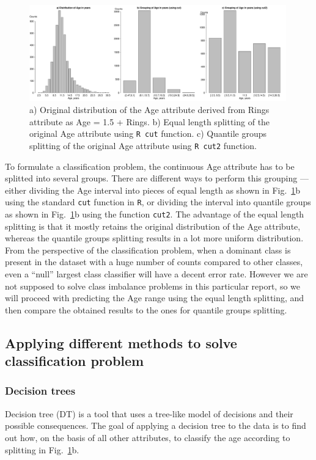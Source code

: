 \documentclass[10pt, paper=a4]{article}
\begin{document}
\begin{figure}[htbp]
  \centering \includegraphics[width =
    0.99\textwidth]{age_grouping.pdf} \cprotect\caption{a) Original
    distribution of the Age attribute derived from Rings attribute as
    Age = 1.5 + Rings.  b) Equal length splitting of the original Age
    attribute using \verb|R cut| function.  c) Quantile groups
    splitting of the original Age attribute using \verb|R cut2|
    function.}
  \label{fig:age_grouping}
\end{figure}

To formulate a classification problem, the continuous Age attribute
has to be splitted into several groups.  There are different ways to
perform this grouping --- either dividing the Age interval into pieces
of equal length as shown in Fig.~\ref{fig:age_grouping}b using the
standard \verb|cut| function in \verb|R|, or dividing the interval
into quantile groups as shown in Fig.~\ref{fig:age_grouping}b using
the function \verb|cut2|.  The advantage of the equal length splitting
is that it mostly retains the original distribution of the Age
attribute, whereas the quantile groups splitting results in a lot more
uniform distribution.  From the perspective of the classification
problem, when a dominant class is present in the dataset with a huge
number of counts compared to other classes, even a ``null'' largest
class classifier will have a decent error rate.  However we are not
supposed to solve class imbalance problems in this particular report,
so we will proceed with predicting the Age range using the equal
length splitting, and then compare the obtained results to the ones
for quantile groups splitting.

\subsection{Applying different methods to solve classification problem}
\subsubsection{Decision trees} %
Decision tree (DT) is a tool that uses a tree-like model of decisions
and their possible consequences.  The goal of applying a decision tree
to the data is to find out how, on the basis of all other attributes,
to classify the age according to splitting in
Fig.~\ref{fig:age_grouping}b.
\end{document}
